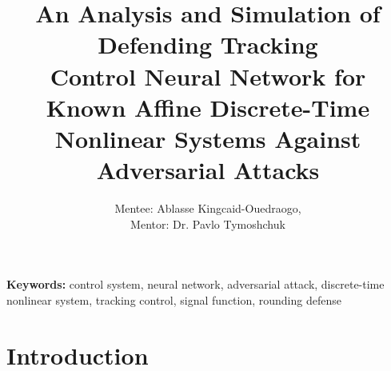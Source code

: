 \documentclass{article}
\begin{document}
\title{An Analysis and Simulation of Defending Tracking \\ Control Neural Network
	for Known Affine Discrete-Time \\ Nonlinear Systems Against Adversarial Attacks}
\author{
	Mentee: Ablasse Kingcaid-Ouedraogo, \\
	Mentor: Dr. Pavlo Tymoshchuk
}
\maketitle

\begin{abstract}
	
\end{abstract}
\noindent \textbf{Keywords:}
control system, neural network, adversarial attack,
discrete-time nonlinear system, tracking control,
signal function, rounding defense
\section*{Introduction}





\newpage



\appendix

\end{document}
